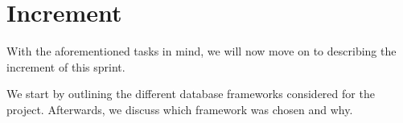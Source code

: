 \section{Increment}
With the aforementioned tasks in mind, we will now move on to describing the increment of this sprint.

We start by outlining the different database frameworks considered for the project.
Afterwards, we discuss which framework was chosen and why.







